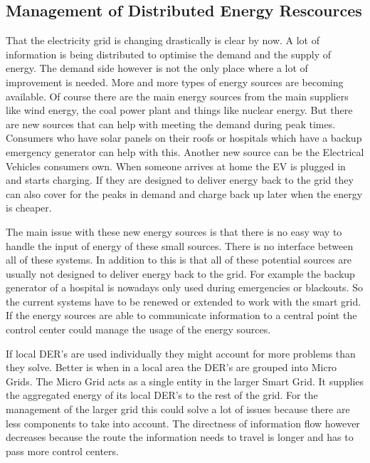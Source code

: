 \subsection{Management of Distributed Energy Rescources}
That the electricity grid is changing drastically is clear by now. A lot of information is being distributed to optimise the demand and the supply of energy. The demand side however is not the only place where a lot of improvement is needed. More and more types of energy sources are becoming available. Of course there are the main energy sources from the main suppliers like wind energy, the coal power plant and things like nuclear energy. But there are new sources that can help with meeting the demand during peak times. Consumers who have solar panels on their roofs or hospitals which have a backup emergency generator can help with this. \cite{Kumagai2012} Another new source can be the Electrical Vehicles consumers own. When someone arrives at home the EV is plugged in and starts charging. If they are designed to deliver energy back to the grid they can also cover for the peaks in demand and charge back up later when the energy is cheaper.

The main issue with these new energy sources is that there is no easy way to handle the input of energy of these small sources. There is no interface between all of these systems. In addition to this is that all of these potential sources are usually not designed to deliver energy back to the grid. For example the backup generator of a hospital is nowadays only used during emergencies or blackouts. So the current systems have to be renewed or extended to work with the smart  grid. If the energy sources are able to communicate information to a central point the control center could manage the usage of the energy sources. 

If local DER's are used individually they might account for more problems than they solve. Better is when in a local area the DER's are grouped into Micro Grids. The Micro Grid acts as a single entity in the larger Smart Grid. It supplies the aggregated energy of its local DER's to the rest of the grid. For the management of the larger grid this could solve a lot of issues because there are less components to take into account. The directness of information flow however decreases because the route the information needs to travel is longer and has to pass more control centers. 


